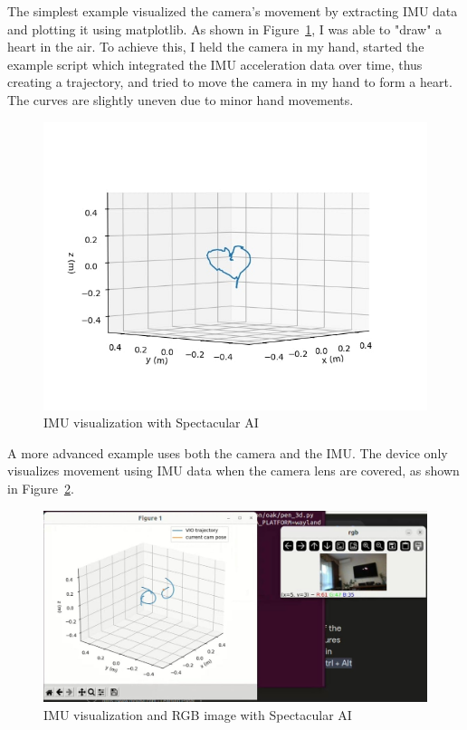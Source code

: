 The simplest example visualized the camera’s movement by extracting IMU data and plotting it using matplotlib. As shown in Figure~\ref{fig:IMU_visu}, I was able to "draw" a heart in the air. To achieve this, I held the camera in my hand, started the example script which integrated the IMU acceleration data over time, thus creating a trajectory, and tried to move the camera in my hand to form a heart. The curves are slightly uneven due to minor hand movements.

\begin{figure}[htbp]
	\centering
	\includegraphics[width=150mm, keepaspectratio]{figures_jpg/spectacular_ai_vio_visu.jpg}
	\caption{IMU visualization with Spectacular AI}
	\label{fig:IMU_visu}
\end{figure}

A more advanced example uses both the camera and the IMU. The device only visualizes movement using IMU data when the camera lens are covered, as shown in Figure~\ref{fig:3d_pen}.

\begin{figure}[htbp]
	\centering
	\includegraphics[width=150mm, keepaspectratio]{figures_jpg/3d_pen.jpg}
	\caption{IMU visualization and RGB image with Spectacular AI}
	\label{fig:3d_pen}
\end{figure}

